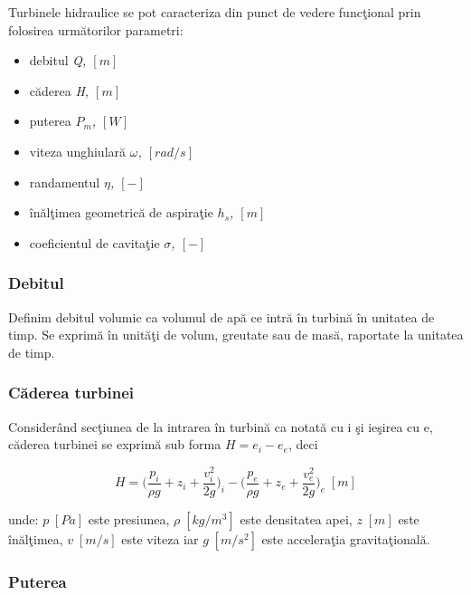 Turbinele hidraulice se pot caracteriza din punct de vedere func\c{t}ional prin folosirea urm\u{a}torilor parametri:

\begin{itemize}
	\item debitul \textit{Q, $[\si{m}]$}
	\item c\u{a}derea \textit{H, $[\si{m}]$}
	\item puterea \textit{$P_m$, $[\si{W}]$}
	\item viteza unghiular\u{a} \textit{\(\omega\), $[\si{rad/s}]$}
	\item randamentul \textit{\(\eta\), $[-]$}
	\item \^{i}n\u{a}l\c{t}imea geometric\u{a} de aspira\c{t}ie \textit{\(h_s\), $[\si{m}]$}
	\item coeficientul de cavita\c{t}ie \textit{\(\sigma\), $[-]$}
\end{itemize}


\subsubsection{Debitul}

Definim debitul volumic ca volumul de ap\u{a} ce intr\u{a} \^{i}n turbin\u{a} \^{i}n unitatea de timp. Se exprim\u{a} \^{i}n unit\u{a}\c{t}i de volum, greutate sau de mas\u{a}, raportate la unitatea de timp.


\subsubsection{C\u{a}derea turbinei}

Consider\^{a}nd sec\c{t}iunea de la intrarea \^{i}n turbin\u{a} ca notat\u{a} cu i \c{s}i ie\c{s}irea cu e, c\u{a}derea turbinei se exprim\u{a} sub forma $H=e_i-e_e$, deci

\begin{equation}
H=\bigg(\frac{p_i}{{\rho}g}+z_i+\frac{v_i^2}{2g}\bigg)_i-\bigg(\frac{p_e}{{\rho}g}+z_e+\frac{v_e^2}{2g}\bigg)_e \;[\si{m}]
\end{equation}

unde: $p\;[\si{Pa}]$ este presiunea, ${\rho}\;[\si{kg/m^3}]$ este densitatea apei, $z\;[\si{m}]$ este \^{i}n\u{a}l\c{t}imea, $v\;[\si{m/s}]$ este viteza iar $g\;[\si{m/s^2}]$ este accelera\c{t}ia gravita\c{t}ional\u{a}.

\subsubsection{Puterea}

